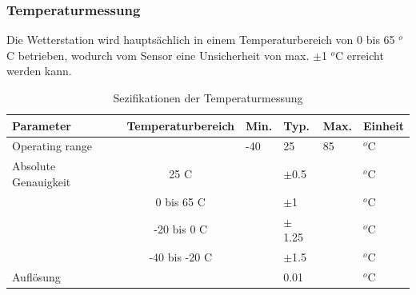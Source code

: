 \subsubsection*{\textbf{Temperaturmessung}}
Die Wetterstation wird hauptsächlich in einem Temperaturbereich von 0 bis 65 $^{o}$C betrieben, wodurch vom Sensor eine Unsicherheit von max. $\pm$1 $^{o}$C erreicht werden kann. \\
\begin{table}[htbp]
  \centering
  \caption{Sezifikationen der Temperaturmessung \cite{Bosch2019}}
    \begin{tabular}{llllll}
    \toprule
    \textbf{Parameter} & \multicolumn{1}{l}{\textbf{Temperaturbereich}} & \multicolumn{1}{l}{\textbf{Min.}} & \textbf{Typ. } & \multicolumn{1}{l}{\textbf{Max.}} & \textbf{Einheit} \\
    \midrule
    Operating range &       & \multicolumn{1}{l}{-40} & 25    & \multicolumn{1}{l}{85} & $^{o}$C \\
    Absolute Genauigkeit & \multicolumn{1}{c}{25 C} &       & $\pm$0.5 &       & $^{o}$C \\
          & \multicolumn{1}{c}{0 bis 65 C} &       & $\pm$1  &       & $^{o}$C \\
          & \multicolumn{1}{c}{-20 bis 0 C} &       & $\pm$1.25 &       & $^{o}$C \\
          & \multicolumn{1}{c}{-40 bis -20 C} &       & $\pm$1.5 &       & $^{o}$C \\
    Auflösung  &       &       & 0.01  &       & $^{o}$C \\
    \bottomrule
    \end{tabular}%
  \label{tab:spez_temp}%
\end{table}%


